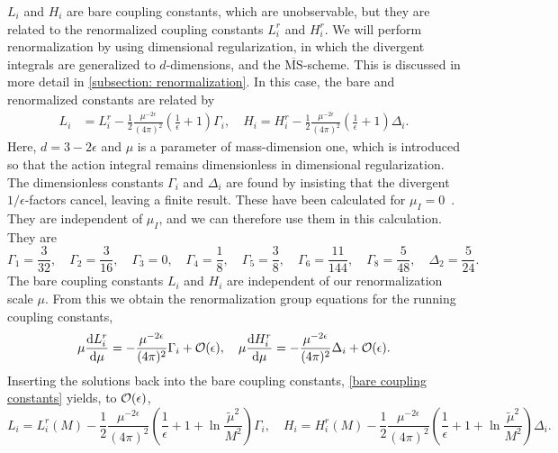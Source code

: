 $L_i$ and $H_i$  are bare coupling constants, which are unobservable, but they are related to the renormalized coupling constants $L_i^r$ and $H_i^r$.
We will perform renormalization by using dimensional regularization, in which the divergent integrals are generalized to $d$-dimensions, and the $\overline{\mathrm{MS}}$-scheme.
This is discussed in more detail in \autoref{subsection: renormalization}.
In this case, the bare and renormalized constants are related by
%
\begin{align}
    \label{bare coupling constants}
    L_i 
    & = 
    L_i^r 
    -
    \frac{1}{2} \frac{\mu^{-2\epsilon}} {(4 \pi)^2}
    \left(\frac{1}{\epsilon} + 1 \right) \Gamma_i, \quad
    H_i = 
    H_i^r
    -  \frac{1}{2}  \frac{\mu^{-2\epsilon}}{(4 \pi)^2} 
    \left(\frac{1}{\epsilon} + 1 \right) \Delta_i .
\end{align}
%
Here, $d = 3 - 2\epsilon$ and $\mu$ is a parameter of mass-dimension one, which is introduced so that the action integral remains dimensionless in dimensional regularization.
The dimensionless constants $\Gamma_i$ and $\Delta_i$ are found by insisting that the divergent $1/\epsilon$-factors cancel, leaving a finite result.
These have been calculated for $\mu_I = 0$~\autocite{gasserChiralPerturbationTheory1985}.
They are independent of $\mu_I$, and we can therefore use them in this calculation.
They are
\begin{equation}
    \Gamma_1 = \frac{3}{32}, \quad
    \Gamma_2 = \frac{3}{16}, \quad
    \Gamma_3 = 0, \quad
    \Gamma_4 = \frac{1}{8}, \quad
    \Gamma_5 = \frac{3}{8}, \quad
    \Gamma_6 = \frac{11}{144}, \quad
    \Gamma_8 = \frac{5}{48}, \quad
    \Delta_2 = \frac{5}{24}.
\end{equation}
%
The bare coupling constants $L_i$ and $H_i$ are independent of our renormalization scale $\mu$.
From this we obtain the renormalization group equations for the running coupling constants,
\begin{equation}
    \mu \diff{L_i^r}{\mu } 
    = - \frac{  \mu^{-2\epsilon} }{(4 \pi)^2} \Gamma_i + \mathcal{O}(\epsilon), \quad
    \mu \diff{H_i^r}{\mu } 
    = - \frac{ \mu^{-2\epsilon}}{(4 \pi)^2} \Delta_i + \mathcal{O}(\epsilon).
\end{equation}
%
Inserting the solutions back into the bare coupling constants, \autoref{bare coupling constants} yields, to $\mathcal O(\epsilon)$,
%
\begin{equation}
    L_i
    = 
    L_i^r(M)
    - \frac{1}{2} \frac{\mu^{-2\epsilon}} {(4 \pi)^2}
    \left(\frac{1}{\epsilon} + 1 + \ln{\frac{\tilde \mu^2}{M^2}}\right) \Gamma_i,
    \quad
    H_i
    = 
    H_i^r (M)
    - \frac{1}{2} \frac{\mu^{-2\epsilon}} {(4 \pi)^2}
    \left(\frac{1}{\epsilon} + 1 + \ln{\frac{\tilde \mu^2}{M^2}}\right) \Delta_i.
\end{equation}
